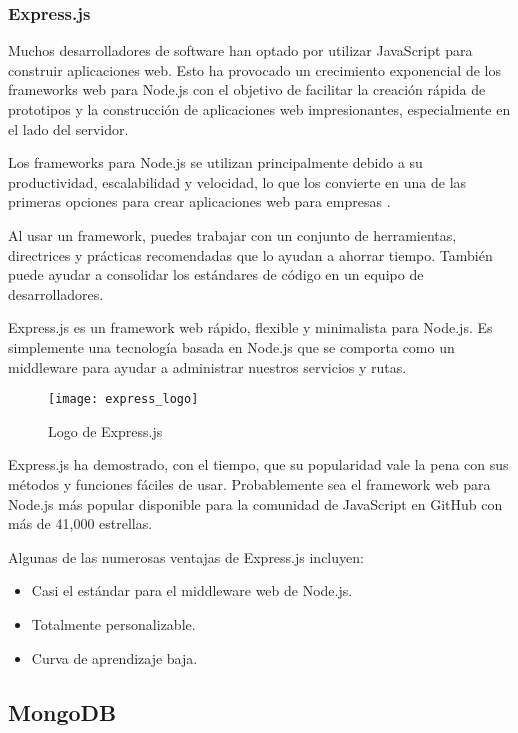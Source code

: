 \subsubsection{Express.js}

Muchos desarrolladores de software han optado por utilizar JavaScript para construir aplicaciones web. Esto ha provocado un crecimiento exponencial de los frameworks web para Node.js con el objetivo de facilitar la creación rápida de prototipos y la construcción de aplicaciones web impresionantes, especialmente en el lado del servidor.

Los frameworks para Node.js se utilizan principalmente debido a su productividad, escalabilidad y velocidad, lo que los convierte en una de las primeras opciones para crear aplicaciones web para empresas \cite{nodejs5}.

Al usar un framework, puedes trabajar con un conjunto de herramientas, directrices y prácticas recomendadas que lo ayudan a ahorrar tiempo. También puede ayudar a consolidar los estándares de código en un equipo de desarrolladores.

Express.js es un framework web rápido, flexible y minimalista para Node.js. Es simplemente una tecnología basada en Node.js que se comporta como un middleware para ayudar a administrar nuestros servicios y rutas.

\begin{figure}[htp!]
  \centering
  \texttt{[image: express\_logo]}
  \caption{Logo de Express.js}
  \label{fig:express_logo}
\end{figure}

Express.js ha demostrado, con el tiempo, que su popularidad vale la pena con sus métodos y funciones fáciles de usar. Probablemente sea el framework web para Node.js más popular disponible para la comunidad de JavaScript en GitHub con más de 41,000 estrellas.

Algunas de las numerosas ventajas de Express.js incluyen:

\begin{itemize}
  \item Casi el estándar para el middleware web de Node.js.
  \item Totalmente personalizable.
  \item Curva de aprendizaje baja.
\end{itemize}

\subsection{MongoDB}

